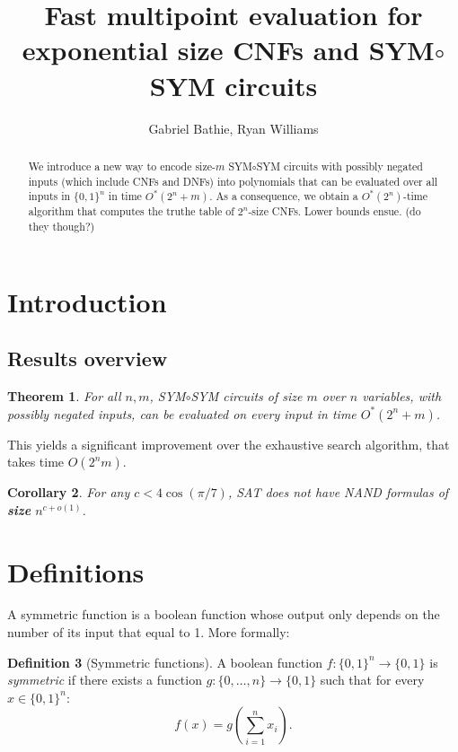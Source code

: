 \documentclass[a4paper, 11pt]{article}
\title{Fast multipoint evaluation for exponential size CNFs and SYM$\circ$SYM circuits}
\author{Gabriel Bathie, Ryan Williams}
\theoremstyle{plain}
\newtheorem{theorem}{Theorem}[section] %
\newtheorem{corollary}[theorem]{Corollary}
\theoremstyle{definition}
\newtheorem{definition}[theorem]{Definition}
\theoremstyle{remark}
\newcommand{\bit}{\{0,1\}}%
\newcommand{\SAT}{\textsf{SAT}}%
\newcommand{\NAND}{\textsf{NAND}}%
\newcommand{\ssym}{\textsf{SYM$\circ$SYM}}%
\begin{document}
\maketitle

\begin{abstract}
We introduce a new way to encode size-$m$ \ssym{} circuits with possibly negated inputs
(which include CNFs and DNFs)
into polynomials that can be evaluated over all inputs in $\bit^n$ in time $O^*(2^n + m)$.
As a consequence, we obtain a $O^*(2^n)$-time algorithm that computes the
truthe table of $2^n$-size CNFs.
Lower bounds ensue. (do they though?)
\end{abstract}


\section{Introduction}

\subsection{Results overview}

\begin{theorem}
	For all $n, m$, \ssym{} circuits of size $m$ over $n$ variables, with possibly negated inputs, can be evaluated
	on every input in time $O^*(2^n + m)$.
\end{theorem}

This yields a significant improvement over the exhaustive search algorithm, that takes time $O(2^nm)$.

\begin{corollary}
	For any $c < 4 \cos(\pi/7)$, \SAT{} does not have \NAND{} formulas of \textbf{size} $n^{c + o(1)}$.
\end{corollary}

\section{Definitions}

A symmetric function is a boolean function whose output only depends on the number of 
its input that equal to 1.
More formally:
\begin{definition}[Symmetric functions]
	A boolean function $f: \bit^n \rightarrow \bit$ is \textit{symmetric} if there exists a function
	$g: \{0,\ldots, n\} \rightarrow \bit$ such that for every $x\in\bit^n$:
	\[f(x) = g\left(\sum_{i=1}^n x_i\right).\]
\end{definition}
\end{document}
